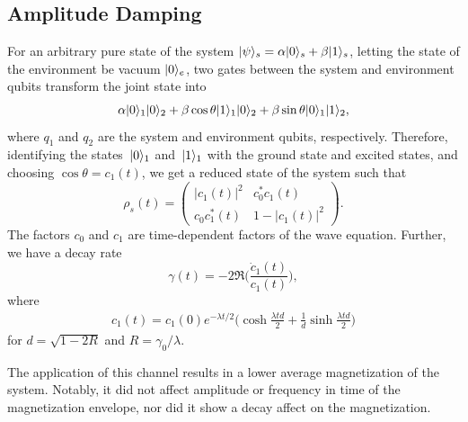 \documentclass[12pt, twocolumn]{article}
\newcommand*{\eu}{e}
\DeclarePairedDelimiter{\ket}{\lvert}{\rangle}
\begin{document}
  \subsection{Amplitude Damping}
  For an arbitrary pure state of the system \( \ket{\psi}_{s} = \alpha \ket{0}_{s} + \beta \ket{1}_{s} \), letting the state of the environment be vacuum \( \ket{0}_{e} \), two gates between the system and environment qubits transform the joint state into
  \begin{equation*}
    \alpha \ket{0}_{1} \ket{0}_{2} + \beta \cos \theta \ket{1}_{1} \ket{0}_{2}
    + \beta \sin \theta \ket{0}_{1} \ket{1}_{2},
  \end{equation*}
  where \( q_{1} \) and \( q_{2} \) are the system and environment qubits, respectively. Therefore, identifying the states~\( \ket{0}_{1} \) and~\( \ket{1}_{1} \) with the ground state and excited states, and choosing \( \cos \theta = c_{1}(t) \), we get a reduced state of the system such that
  \begin{equation}
    \rho_{s}(t)
      = \begin{pmatrix}
          \lvert c_{1}^{}(t) \rvert^{2} & c_{0}^{*} c_{1}^{}(t)             \\
          c_{0}^{} c_{1}^{*}(t)         & 1 - \lvert c_{1}^{}(t) \rvert^{2}
        \end{pmatrix}.
  \end{equation}
  The factors \( c_{0} \) and \( c_{1} \) are time-dependent factors of the wave equation. Further, we have a decay rate
  \begin{equation}
    \gamma(t) = -2 \Re \biggl( \frac{\dot{c}_{1}(t)}{c_{1}(t)} \biggr),
  \end{equation}
  where
  \begin{align}
    c_{1}(t)
      = c_{1}(0) \eu^{-\lambda t / 2}
        \biggl(
          \cosh \frac{\lambda t d}{2}
            + \frac{1}{d}
              \sinh \frac{\lambda t d}{2}
        \biggr)
  \end{align}
  for \( d = \sqrt{1 - 2 R} \) and \( R = \gamma_{0} / \lambda \).

  The application of this channel results in a lower average magnetization of the system. Notably, it did not affect amplitude or frequency in time of the magnetization envelope, nor did it show a decay affect on the magnetization.
\end{document}
